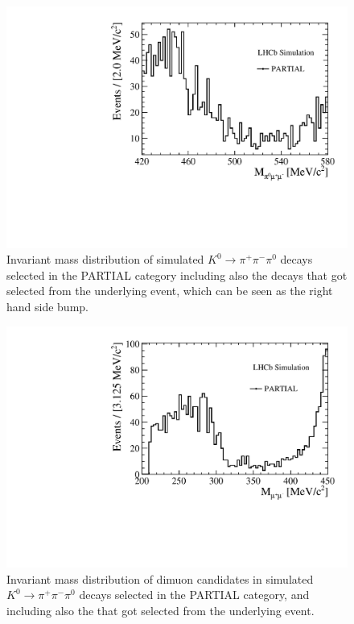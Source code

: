 \begin{figure} [htb!]
\begin{center}
\includegraphics[scale=0.60]{figs/M_V0_K3pi_Kspipi.pdf}%
\caption{Invariant mass distribution of simulated $K^0\rightarrow\pi^+\pi^-\pi^0$ decays selected in the PARTIAL category including also the \Kspipi decays that got selected from the underlying event, 
which can be seen as the right hand side bump. \label{fig:KLTpi_wKspipi}}
\end{center}
\end{figure}
   
\begin{figure} [htb!]
\begin{center}
\includegraphics[scale=0.60]{figs/M_mumu_K3pi_Kspipi.pdf}%
\caption{Invariant mass distribution of dimuon candidates in simulated $K^0\rightarrow\pi^+\pi^-\pi^0$ decays selected in the PARTIAL category, and including also the \Kspipi that got selected from the underlying event. 
\label{fig:mumuKspipi}}
\end{center}
\end{figure}

